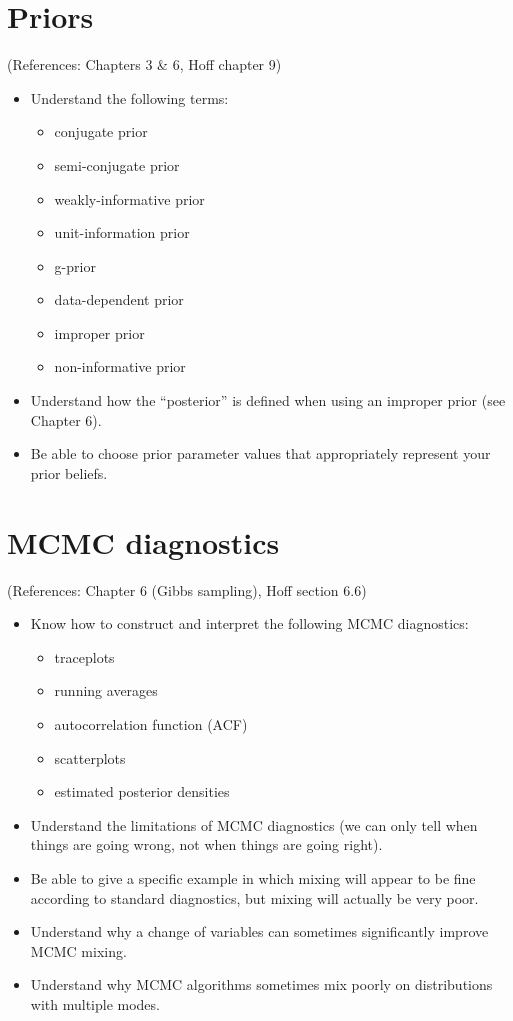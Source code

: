 \documentclass[12pt]{article}
\begin{document}
\section{Priors}
(References: Chapters 3 \& 6, Hoff chapter 9)
\begin{itemize}
\setlength\itemsep{0em}
\item Understand the following terms:
\begin{itemize}
\setlength\itemsep{0em}
    \item conjugate prior
    \item semi-conjugate prior
    \item weakly-informative prior
    \item unit-information prior
    \item g-prior
    \item data-dependent prior
    \item improper prior
    \item non-informative prior
\end{itemize}
\item Understand how the ``posterior'' is defined when using an improper prior (see Chapter 6).
\item Be able to choose prior parameter values that appropriately represent your prior beliefs.
\end{itemize}




\section{MCMC diagnostics}
(References: Chapter 6 (Gibbs sampling), Hoff section 6.6)
\begin{itemize}
\setlength\itemsep{0em}
\item Know how to construct and interpret the following MCMC diagnostics:
\begin{itemize}
\setlength\itemsep{0em}
    \item traceplots
    \item running averages
    \item autocorrelation function (ACF)
    \item scatterplots
    \item estimated posterior densities
\end{itemize}
\item Understand the limitations of MCMC diagnostics (we can only tell when things are going wrong, not when things are going right).
\item Be able to give a specific example in which mixing will appear to be fine according to standard diagnostics, but mixing will actually be very poor.
\item Understand why a change of variables can sometimes significantly improve MCMC mixing.
\item Understand why MCMC algorithms sometimes mix poorly on distributions with multiple modes.
\end{itemize}
\end{document}
